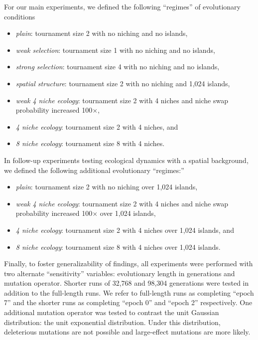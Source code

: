 For our main experiments, we defined the following ``regimes'' of evolutionary conditions
\begin{itemize}
    \item \textit{plain}: tournament size 2 with no niching and no islands,
    \item \textit{weak selection}: tournament size 1 with no niching and no islands,
    \item \textit{strong selection}: tournament size 4 with no niching and no islands,
    \item \textit{spatial structure}: tournament size 2 with no niching and 1,024 islands,
    \item \textit{weak 4 niche ecology}: tournament size 2 with 4 niches and niche swap probability increased 100$\times$,
    \item \textit{4 niche ecology}: tournament size 2 with 4 niches, and
    \item \textit{8 niche ecology}: tournament size 8 with 4 niches.
\end{itemize}

In follow-up experiments testing ecological dynamics with a spatial background, we defined the following additional evolutionary ``regimes:''
\begin{itemize}
    \item \textit{plain}: tournament size 2 with no niching over 1,024 islands,
    \item \textit{weak 4 niche ecology}: tournament size 2 with 4 niches and niche swap probability increased 100$\times$ over 1,024 islands,    
    \item \textit{4 niche ecology}: tournament size 2 with 4 niches over 1,024 islands, and
    \item \textit{8 niche ecology}: tournament size 8 with 4 niches over 1,024 islands.
\end{itemize}

Finally, to foster generalizability of findings, all experiments were performed with two alternate ``sensitivity'' variables: evolutionary length in generations and mutation operator.
Shorter runs of 32,768 and 98,304 generations were tested in addition to the full-length runs. 
We refer to full-length runs as completing ``epoch 7'' and the shorter runs as completing ``epoch 0'' and ``epoch 2'' respectively.
One additional mutation operator was tested to contrast the unit Gaussian distribution: the unit exponential distribution.
Under this distribution, deleterious mutations are not possible and large-effect mutations are more likely.

